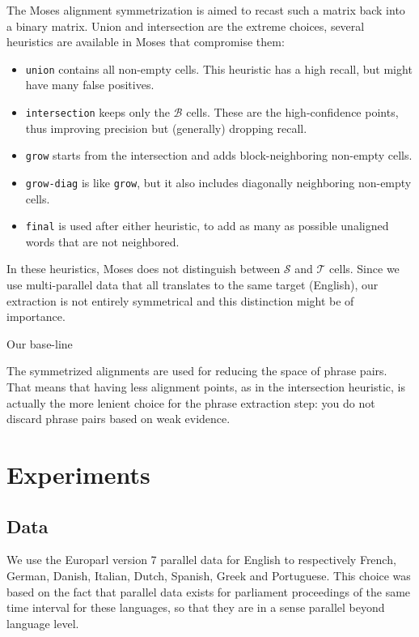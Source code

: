 \documentclass[11pt]{article}
\begin{document}
The Moses alignment symmetrization is aimed to recast such a matrix back into a binary matrix. Union and intersection are the extreme choices, several  heuristics are available in Moses that compromise them:\begin{itemize}
\item {\tt union} contains all non-empty cells. This heuristic has a high recall, but might have many false positives.
\item  {\tt intersection} keeps only the $\mathcal B$ cells. These are the high-confidence points, thus improving precision but (generally) dropping recall.
\item {\tt grow} starts from the intersection and adds block-neighboring non-empty cells.
\item {\tt grow-diag} is like {\tt grow}, but it also includes diagonally neighboring non-empty cells.
\item {\tt final} is used after either heuristic, to add as many as possible unaligned words that are not neighbored.  %
\end{itemize}

In these heuristics, Moses does not distinguish between $\mathcal S$ and $\mathcal T$ cells. Since we use multi-parallel data that all translates to the same target (English), our extraction is not entirely symmetrical and this distinction might be of importance. 

Our base-line 

The symmetrized alignments are used for reducing the space of phrase pairs. That means that having less alignment points, as in the intersection heuristic, is actually the more lenient choice for the phrase extraction step: you do not discard phrase pairs based on weak evidence. 



\section{Experiments}

\subsection{Data}

We use the Europarl version 7 parallel data for English to respectively French, German, Danish, Italian, Dutch, Spanish, Greek
 and Portuguese. This choice was based on the fact that parallel data exists for parliament proceedings of the same time interval for these languages, so that they are in a sense parallel beyond language level.
\end{document}
